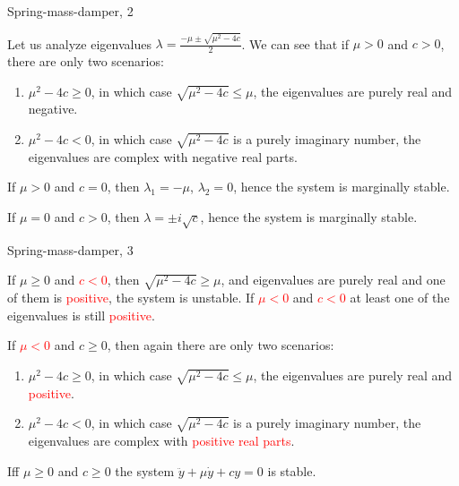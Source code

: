 \documentclass{beamer}
\begin{document}
\begin{frame}{Spring-mass-damper, 2}
	\begin{flushleft}
		
		Let us analyze eigenvalues $\lambda = \frac{-\mu \pm \sqrt{\mu^2 - 4 c} }{2}$. We can see that if \textcolor{mydarkgreen}{$\mu > 0$} and \textcolor{mydarkgreen}{$ c > 0$}, there are only two scenarios: 
		
		\begin{enumerate}
			\item $\mu^2 - 4c \geq 0$, in which case $\sqrt{\mu^2 - 4c} \leq \mu$, the eigenvalues are purely real and \textcolor{mydarkgreen}{negative}.
			\item $\mu^2 - 4c < 0$, in which case $\sqrt{\mu^2 - 4c}$ is a purely imaginary number, the eigenvalues are complex with \textcolor{mydarkgreen}{negative real parts}.
		\end{enumerate}
		
		If $\mu > 0$ and \textcolor{myblue}{$c = 0$}, then $\lambda_1 = -\mu$, $\lambda_2 = 0$, hence the system is \textcolor{myblue}{marginally stable}.
		
		If \textcolor{myblue}{$\mu = 0$} and $c > 0$, then $\lambda = \pm i \sqrt{c}$, hence the system is \textcolor{myblue}{marginally stable}.
		
	\end{flushleft}
\end{frame}



\begin{frame}{Spring-mass-damper, 3}
	\begin{flushleft}
		
		
		If $\mu \geq 0$ and \textcolor{red}{$c < 0$}, then $\sqrt{\mu^2 - 4c} \geq \mu$, and eigenvalues are purely real and one of them is \textcolor{red}{positive}, the system is unstable. If \textcolor{red}{$\mu < 0$} and \textcolor{red}{$c < 0$} at least one of the eigenvalues is still \textcolor{red}{positive}.
		
		\bigskip
		
		If \textcolor{red}{$\mu < 0$} and $c \geq 0$, then again there are only two scenarios: 
		
		\begin{enumerate}
			\item $\mu^2 - 4c \geq 0$, in which case $\sqrt{\mu^2 - 4c} \leq \mu$, the eigenvalues are purely real and \textcolor{red}{positive}.
			\item $\mu^2 - 4c < 0$, in which case $\sqrt{\mu^2 - 4c}$ is a purely imaginary number, the eigenvalues are complex with \textcolor{red}{positive real parts}.
		\end{enumerate}
		
		\begin{definition}
			Iff $\mu \geq 0$ and $c \geq 0$ the system $\ddot y + \mu \dot y + c y = 0$ is stable.
		\end{definition}
		
	\end{flushleft}
\end{frame}
\end{document}
